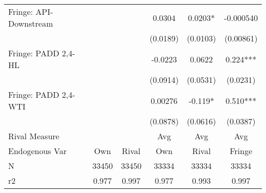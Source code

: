 {\begin{tabular}{l*{5}{c}}
\addlinespace
Fringe: API-Downstream&            &            &   0.0304   &   0.0203*  &-0.000540   \\
                &            &            & (0.0189)   & (0.0103)   &(0.00861)   \\
\addlinespace
Fringe: PADD 2,4-HL&            &            &  -0.0223   &   0.0622   &    0.224***\\
                &            &            & (0.0914)   & (0.0531)   & (0.0231)   \\
\addlinespace
Fringe: PADD 2,4-WTI&            &            &  0.00276   &   -0.119*  &    0.510***\\
                &            &            & (0.0878)   & (0.0616)   & (0.0387)   \\
\midrule
Rival Measure   &            &            &      Avg   &      Avg   &      Avg   \\
Endogenous Var  &      Own   &    Rival   &      Own   &    Rival   &   Fringe   \\
N               &    33450   &    33450   &    33334   &    33334   &    33334   \\
r2              &    0.977   &    0.997   &    0.977   &    0.993   &    0.997   \\
\bottomrule
\end{tabular}
}
